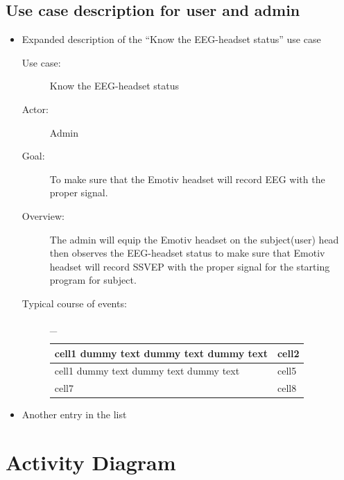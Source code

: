 \subsection{Use case description for user and admin}
\begin{itemize}
	\item Expanded description of the “Know the EEG-headset status” use case
	\begin{description}
		\item [Use case:]Know the EEG-headset status 
		\item [Actor:]Admin 
		\item [Goal:]To make sure that the Emotiv headset will record EEG with the proper signal. 
		\item[Overview:]The admin will equip the Emotiv headset on the subject(user) head then observes the EEG-headset status to make sure that Emotiv headset will record SSVEP with the proper signal for the starting program for subject.	
		\item[Typical course of events:] _
		\begin{center}
			\begin{tabular}{ | m{6cm}| m{6cm} | } 
				\hline
				cell1 dummy text dummy text dummy text& cell2  \\ 
				\hline
				cell1 dummy text dummy text dummy text & cell5  \\ 
				\hline
				cell7 & cell8  \\ 
				\hline
			\end{tabular}
		\end{center}
		
	\end{description}
	\item Another entry in the list
\end{itemize}


\section{Activity Diagram}
